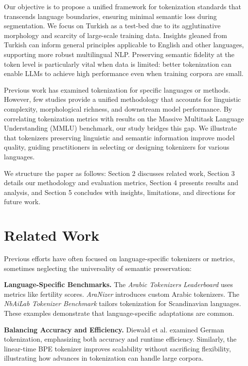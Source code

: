   Our objective is to propose a unified framework for tokenization standards that transcends language boundaries, ensuring minimal semantic loss during segmentation. We focus on Turkish as a test-bed due to its agglutinative morphology and scarcity of large-scale training data. Insights gleaned from Turkish can inform general principles applicable to English and other languages, supporting more robust multilingual NLP. Preserving semantic fidelity at the token level is particularly vital when data is limited: better tokenization can enable LLMs to achieve high performance even when training corpora are small.
  
  Previous work has examined tokenization for specific languages or methods. However, few studies provide a unified methodology that accounts for linguistic complexity, morphological richness, and downstream model performance. By correlating tokenization metrics with results on the Massive Multitask Language Understanding (MMLU) benchmark, our study bridges this gap. We illustrate that tokenizers preserving linguistic and semantic information improve model quality, guiding practitioners in selecting or designing tokenizers for various languages.
  
  We structure the paper as follows: Section 2 discusses related work, Section 3 details our methodology and evaluation metrics, Section 4 presents results and analysis, and Section 5 concludes with insights, limitations, and directions for future work.
  
  \section{Related Work}
  
  Previous efforts have often focused on language-specific tokenizers or metrics, sometimes neglecting the universality of semantic preservation:
  
  \textbf{Language-Specific Benchmarks.} The \textit{Arabic Tokenizers Leaderboard} \cite{noauthor_arabic_nodate} uses metrics like fertility scores. \textit{AraNizer} \cite{noauthor_riotu-labaranizer_2024} introduces custom Arabic tokenizers. The \textit{NbAiLab Tokenizer Benchmark} \cite{noauthor_nbailabtokenizer-benchmark_2024} tailors tokenization for Scandinavian languages. These examples demonstrate that language-specific adaptations are common.
  
  \textbf{Balancing Accuracy and Efficiency.} Diewald et al. \cite{diewald_tokenizing_2022} examined German tokenization, emphasizing both accuracy and runtime efficiency. Similarly, the linear-time BPE tokenizer \cite{neubeck_so_2024} improves scalability without sacrificing flexibility, illustrating how advances in tokenization can handle large corpora.
  
